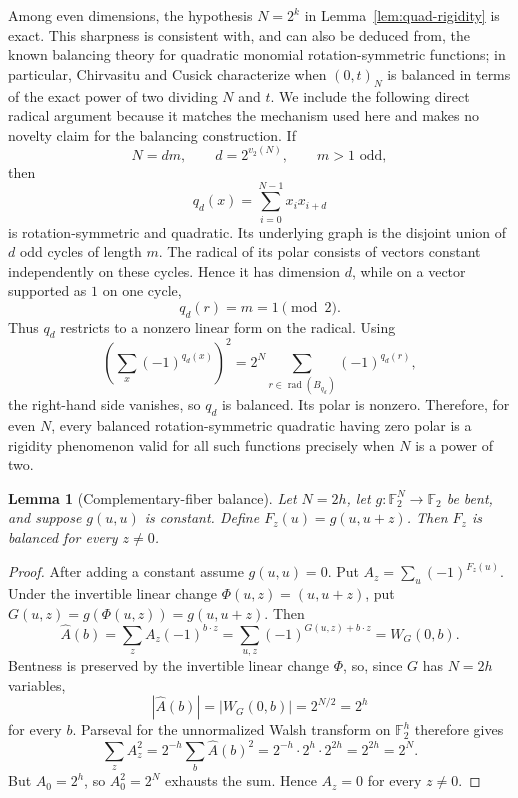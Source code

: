 \documentclass[11pt,a4paper]{article}
\newtheorem{lemma}[theorem]{Lemma}
\newcommand{\F}{\mathbb F_2}
\begin{document}
\begin{remark}\label{rem:quad-sharp}
Among even dimensions, the hypothesis \(N=2^k\) in Lemma~\ref{lem:quad-rigidity} is exact. This sharpness is consistent with, and can also be deduced from, the known balancing theory for quadratic monomial rotation-symmetric functions; in particular, Chirvasitu and Cusick characterize when \((0,t)_N\) is balanced in terms of the exact power of two dividing \(N\) and \(t\). We include the following direct radical argument because it matches the mechanism used here and makes no novelty claim for the balancing construction. If
\[
N=dm,\qquad d=2^{v_2(N)},\qquad m>1\text{ odd},
\]
then
\[
q_d(x)=\sum_{i=0}^{N-1}x_i x_{i+d}
\]
is rotation-symmetric and quadratic. Its underlying graph is the disjoint union of \(d\) odd cycles of length \(m\). The radical of its polar consists of vectors constant independently on these cycles. Hence it has dimension \(d\), while on a vector supported as \(1\) on one cycle,
\[
q_d(r)=m=1\pmod2.
\]
Thus \(q_d\) restricts to a nonzero linear form on the radical. Using
\[
\left(\sum_x(-1)^{q_d(x)}\right)^2
=2^N\sum_{r\in\operatorname{rad}(B_{q_d})}(-1)^{q_d(r)},
\]
the right-hand side vanishes, so \(q_d\) is balanced. Its polar is nonzero. Therefore, for even \(N\), every balanced rotation-symmetric quadratic having zero polar is a rigidity phenomenon valid for all such functions precisely when \(N\) is a power of two.
\end{remark}

\begin{lemma}[Complementary-fiber balance]\label{lem:fiber-balance}
Let \(N=2h\), let \(g:\F^N\to\F\) be bent, and suppose \(g(u,u)\) is constant. Define \(F_z(u)=g(u,u+z)\). Then \(F_z\) is balanced for every \(z\ne0\).
\end{lemma}
\begin{proof}
After adding a constant assume \(g(u,u)=0\). Put \(A_z=\sum_u(-1)^{F_z(u)}\). Under the invertible linear change \(\Phi(u,z)=(u,u+z)\), put \(G(u,z)=g(\Phi(u,z))=g(u,u+z)\). Then
\[
\widehat A(b)=\sum_z A_z(-1)^{b\cdot z}
=\sum_{u,z}(-1)^{G(u,z)+b\cdot z}
=W_G(0,b).
\]
Bentness is preserved by the invertible linear change \(\Phi\), so, since \(G\) has \(N=2h\) variables,
\[
|\widehat A(b)|=|W_G(0,b)|=2^{N/2}=2^h
\]
for every \(b\). Parseval for the unnormalized Walsh transform on \(\F^h\) therefore gives
\[
\sum_zA_z^2
=2^{-h}\sum_b\widehat A(b)^2
=2^{-h}\cdot 2^h\cdot 2^{2h}
=2^{2h}=2^N.
\]
But \(A_0=2^h\), so \(A_0^2=2^N\) exhausts the sum. Hence \(A_z=0\) for every \(z\ne0\).
\end{proof}
\end{document}

